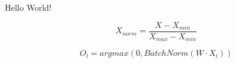 \documentclass{article}
\begin{document}
Hello World!

$$ X_{norm}=\frac{X-X_{min}}{X_{max}-X_{min}} $$

$$ O_{l}=argmax(0, BatchNorm(W \cdot X_{l})) $$
\end{document}
